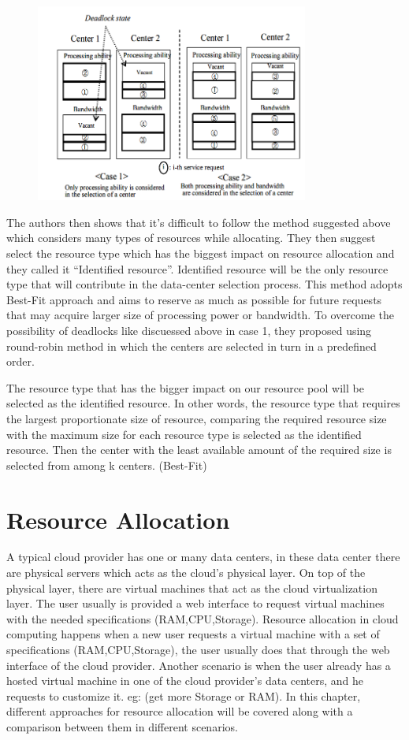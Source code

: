 \documentclass{article}
\begin{document}
\begin{figure}[htb]
\centering
\includegraphics[width=0.8\textwidth]{pasted1}
\end{figure}

The authors then shows that it's difficult to follow the method suggested above which considers many types of resources while allocating. They then suggest select the resource type which has the biggest impact on resource allocation and they called it “Identified resource”. Identified resource will be the only resource type that will contribute in the data-center selection process. This method adopts Best-Fit approach and aims to reserve as much as possible for future requests that may acquire larger size of processing power or bandwidth. To overcome the possibility of deadlocks like discuessed above in case 1, they proposed using round-robin method in which the centers are selected in turn in a predefined order.

The resource type that has the bigger impact on our resource pool will be selected as the identified resource. In other words, the resource type that requires the largest proportionate size of resource, comparing the required resource size with the maximum size for each resource type is selected as the identified resource. Then the center with the least available amount of the required size is selected from among k centers. (Best-Fit)\cite{optimaljoint}

\section{Resource Allocation}
A typical cloud provider has one or many data centers, in these data center there are physical servers which acts as the cloud's physical layer. On top of the physical layer, there are virtual machines that act as the cloud virtualization layer. The user usually is provided a web interface to request virtual machines with the needed specifications (RAM,CPU,Storage). Resource allocation in cloud computing happens when a new user requests a virtual machine with a set of specifications (RAM,CPU,Storage), the user usually does that through the web interface of the cloud provider. Another scenario is when the user already has a hosted virtual machine in one of the cloud provider's data centers, and he requests to customize it. eg: (get more Storage or RAM). In this chapter, different approaches for resource allocation will be covered along with a comparison between them in different scenarios.
\end{document}

